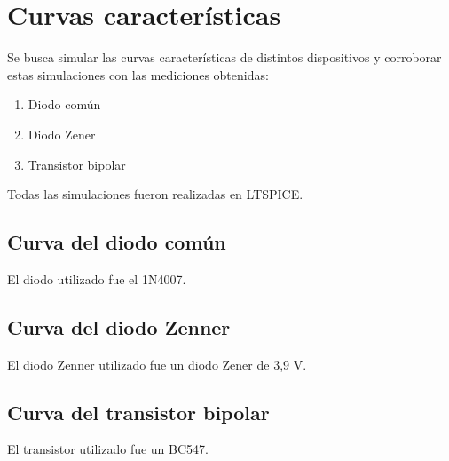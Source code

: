 \documentclass[../../e1_tp1_main.tex]{subfiles}
\begin{document}
\chapter{Curvas características}
Se busca simular las curvas características de distintos dispositivos y corroborar estas simulaciones con las mediciones obtenidas:

\begin{enumerate}
	\item Diodo común
	\item Diodo Zener
	\item Transistor bipolar
\end{enumerate}

Todas las simulaciones fueron realizadas en LTSPICE. 

\section{Curva del diodo común}
	El diodo utilizado fue el 1N4007.

\section{Curva del diodo Zenner}
	El diodo Zenner utilizado fue un diodo Zener de 3,9 V.
	
\section{Curva del transistor bipolar}
 El transistor utilizado fue un BC547.
\end{document}
